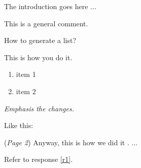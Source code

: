 \reviewer

The introduction goes here ...

\begin{generalcomment}
	This is a general comment.
\end{generalcomment}

\begin{revcomment}\label{c1}
	How to generate a list?
\end{revcomment}

\begin{revresponse}\label{r1}
	This is how you do it.
	\begin{enumerate}
		\item item 1
		\item item 2
	\end{enumerate}

\end{revresponse}

\begin{revcomment}\label{c2}
	\emph{Emphasis the changes.}
\end{revcomment}

\begin{revresponse}
	Like this:

	\begin{changes}
		(\emph{Page 2}) Anyway, this is how we did it \cite{2013Management}. ... 
	\end{changes}

	Refer to response \ref{r1}.


\end{revresponse}

